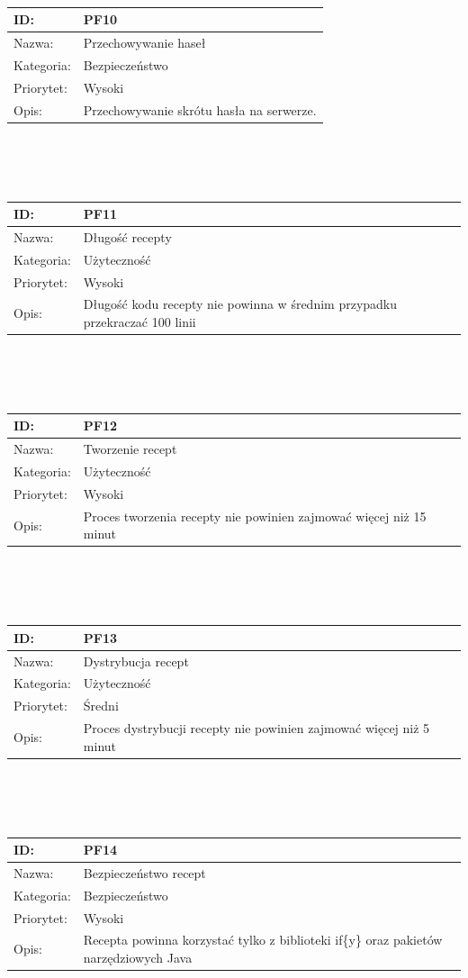 \documentclass[11pt,a4paper,polish,thesis]{dcsbook}
\begin{document}
\begin{tabular}{|p{2cm}|p{12cm}|}
\\ \hline \end{tabular} \\\\\ \begin{tabular}{|p{2cm}|p{12cm}|}  \hline ID: &
PF10
\\ \hline Nazwa: &
Przechowywanie haseł
\\ \hline Kategoria: &
Bezpieczeństwo
\\ \hline Priorytet: &
Wysoki
\\ \hline Opis: &
Przechowywanie skrótu hasła na serwerze.
\\ \hline \end{tabular} \\\\\ \begin{tabular}{|p{2cm}|p{12cm}|}  \hline ID: &
PF11
\\ \hline Nazwa: &
Długość recepty
\\ \hline Kategoria: &
Użyteczność
\\ \hline Priorytet: &
Wysoki
\\ \hline Opis: &
Długość kodu recepty nie powinna w średnim przypadku przekraczać 100 linii
\\ \hline \end{tabular} \\\\\ \begin{tabular}{|p{2cm}|p{12cm}|}  \hline ID: &
PF12
\\ \hline Nazwa: &
Tworzenie recept
\\ \hline Kategoria: &
Użyteczność
\\ \hline Priorytet: &
Wysoki
\\ \hline Opis: &
Proces tworzenia recepty nie powinien zajmować więcej niż 15 minut
\\ \hline \end{tabular} \\\\\ \begin{tabular}{|p{2cm}|p{12cm}|}  \hline ID: &
PF13
\\ \hline Nazwa: &
Dystrybucja recept
\\ \hline Kategoria: &
Użyteczność
\\ \hline Priorytet: &
Średni
\\ \hline Opis: &
Proces dystrybucji recepty nie powinien zajmować więcej niż 5 minut
\\ \hline \end{tabular} \\\\\ \begin{tabular}{|p{2cm}|p{12cm}|}  \hline ID: &
PF14
\\ \hline Nazwa: &
Bezpieczeństwo recept
\\ \hline Kategoria: &
Bezpieczeństwo
\\ \hline Priorytet: &
Wysoki
\\ \hline Opis: &
Recepta powinna korzystać tylko z biblioteki if\{y\} oraz pakietów narzędziowych Java
\\ \hline \end{tabular}
\end{document}
